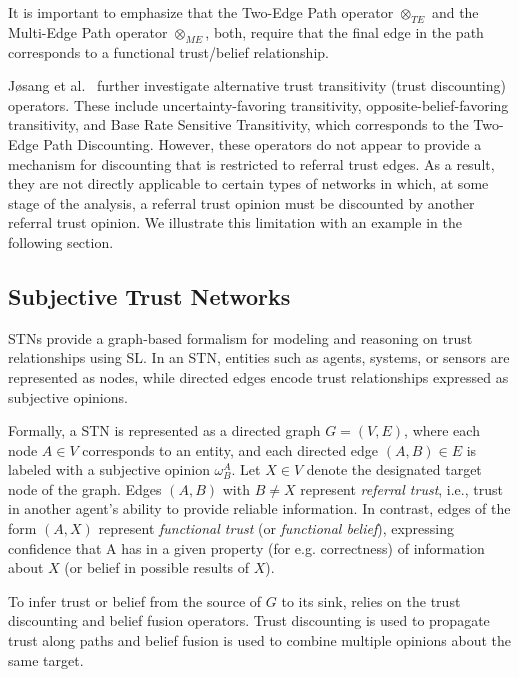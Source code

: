 It is important to emphasize that the Two-Edge Path operator $\otimes_{TE}$ and the Multi-Edge Path operator $\otimes_{ME}$, both, require that the final edge in the path corresponds to a functional trust/belief relationship. 

J{\o}sang et al.~\cite{josang2006exploring} further investigate alternative trust transitivity (trust discounting) operators. These include uncertainty-favoring transitivity, opposite-belief-favoring transitivity, and Base Rate Sensitive Transitivity, which corresponds to the Two-Edge Path Discounting. However, these operators do not appear to provide a mechanism for discounting that is restricted to referral trust edges. As a result, they are not directly applicable to certain types of networks in which, at some stage of the analysis, a referral trust opinion must be discounted by another referral trust opinion. We illustrate this limitation with an example in the following section.

\subsection{Subjective Trust Networks} \label{subsec:SL_STN}
\acfp{STN} provide a graph-based formalism for modeling and reasoning on trust relationships using \ac{SL}. In an \ac{STN}, entities such as agents, systems, or sensors are represented as nodes, while directed edges encode trust relationships expressed as subjective opinions.

Formally, a \ac{STN} is represented as a directed graph \(G = (V, E)\), where each node \(A \in V\) corresponds to an entity, and each directed edge $(A,B) \in E$ is labeled with a subjective opinion \(\omega^A_B\). Let \(X \in V\) denote the designated target node of the graph. Edges \((A,B)\) with \(B \neq X\) represent \emph{referral trust}, i.e., trust in another agent’s ability to provide reliable information. In contrast, edges of the form \((A,X)\) represent \emph{functional trust} (or \emph{functional belief}), expressing confidence that A has in a given property (for e.g. correctness) of information about \(X\) (or belief in possible results of \(X\)).

To infer trust or belief from the source of \(G\) to its sink,  relies on the trust discounting and belief fusion operators. Trust discounting is used to propagate trust along paths and belief fusion is used to combine multiple opinions about the same target. 
